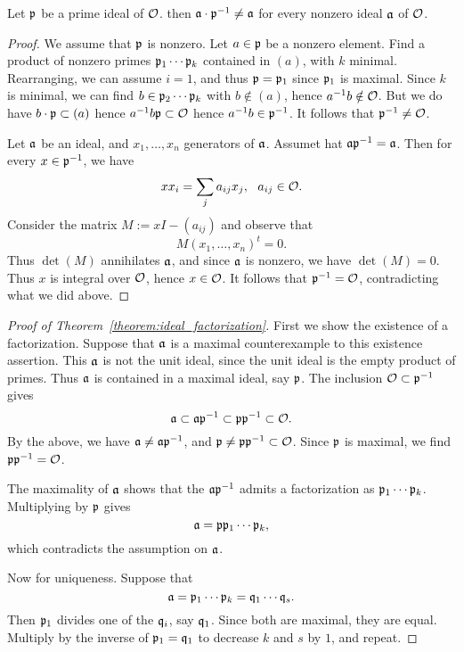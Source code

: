 \begin{lemma}
  Let $\mathfrak{p}$ be a prime ideal of $\mathcal{O}$.
  then $\mathfrak{a} \cdot \mathfrak{p}^{-1} \neq \mathfrak{a}$ for every nonzero ideal $\mathfrak{a}$ of $\mathcal{O}$.
\end{lemma}
\begin{proof}
  We  assume that $\mathfrak{p}$ is nonzero.
  Let $a \in \mathfrak{p}$ be a nonzero element.
  Find a product of nonzero primes $\mathfrak{p}_{1} \cdots \mathfrak{p}_{k}$ contained in $(a)$, with $k$ minimal.
  Rearranging, we can assume $i = 1$, and thus $\mathfrak{p} = \mathfrak{p}_{1}$ since $\mathfrak{p}_{1}$ is maximal.
  Since $k$ is minimal, we can find $b \in \mathfrak{p}_{2} \cdots \mathfrak{p}_{k}$ with $b \notin (a)$, hence $a^{-1}b \notin \mathcal{O}$.
  But we do have $b \cdot \mathfrak{p} \subset (a)$ hence $a^{-1} b \mathfrak{p} \subset \mathcal{O}$ hence $a^{-1}b \in \mathfrak{p}^{-1}$.
  It follows that $\mathfrak{p}^{-1} \neq \mathcal{O}$.

  Let $\mathfrak{a}$ be an ideal, and $x_{1},\ldots,x_{n}$ generators of $\mathfrak{a}$.
  Assumet hat $\mathfrak{a} \mathfrak{p}^{-1} = \mathfrak{a}$.
  Then for every $x \in \mathfrak{p}^{-1}$, we have
  \[ x x_{i} = \sum_{j} a_{ij} x_{j}, \ \ a_{ij} \in \mathcal{O}. \]
  Consider the matrix $M := xI - (a_{ij})$ and observe that
  \[ M (x_{1},\ldots,x_{n})^{t} = 0.  \]
  Thus $\det(M)$ annihilates $\mathfrak{a}$, and since $\mathfrak{a}$ is nonzero, we have $\det(M) = 0$.
  Thus $x$ is integral over $\mathcal{O}$, hence $x \in \mathcal{O}$.
  It follows that $\mathfrak{p}^{-1} = \mathcal{O}$, contradicting what we did above.
\end{proof}

\begin{proof}[Proof of Theorem~\ref{theorem:ideal_factorization}]
  First we show the existence of a factorization.
  Suppose that $\mathfrak{a}$ is a maximal counterexample to this existence assertion.
  This $\mathfrak{a}$ is not the unit ideal, since the unit ideal is the empty product of primes.
  Thus $\mathfrak{a}$ is contained in a maximal ideal, say $\mathfrak{p}$.
  The inclusion $\mathcal{O} \subset \mathfrak{p}^{-1}$ gives
  \[ \mathfrak{a} \subset \mathfrak{a} \mathfrak{p}^{-1} \subset \mathfrak{p} \mathfrak{p}^{-1} \subset \mathcal{O}. \]
  By the above, we have $\mathfrak{a} \neq \mathfrak{a} \mathfrak{p}^{-1}$, and $\mathfrak{p} \neq \mathfrak{p} \mathfrak{p}^{-1} \subset \mathcal{O}$.
  Since $\mathfrak{p}$ is maximal, we find $\mathfrak{p} \mathfrak{p}^{-1} = \mathcal{O}$.

  The maximality of $\mathfrak{a}$ shows that the  $\mathfrak{a} \mathfrak{p}^{-1}$ admits a factorization as $\mathfrak{p}_{1} \cdots \mathfrak{p}_{k}$.
  Multiplying by $\mathfrak{p}$ gives
  \[ \mathfrak{a} = \mathfrak{p} \mathfrak{p}_{1} \cdots \mathfrak{p}_{k}, \]
  which contradicts the assumption on $\mathfrak{a}$.

  Now for uniqueness.
  Suppose that
  \[ \mathfrak{a} = \mathfrak{p}_{1} \cdots \mathfrak{p}_{k} = \mathfrak{q}_{1} \cdots \mathfrak{q}_{s}. \]
  Then $\mathfrak{p}_{1}$ divides one of the $\mathfrak{q}_{i}$, say $\mathfrak{q}_{1}$.
  Since both are maximal, they are equal.
  Multiply by the inverse of $\mathfrak{p}_{1} = \mathfrak{q}_{1}$ to decrease $k$ and $s$ by $1$, and repeat.
\end{proof}

